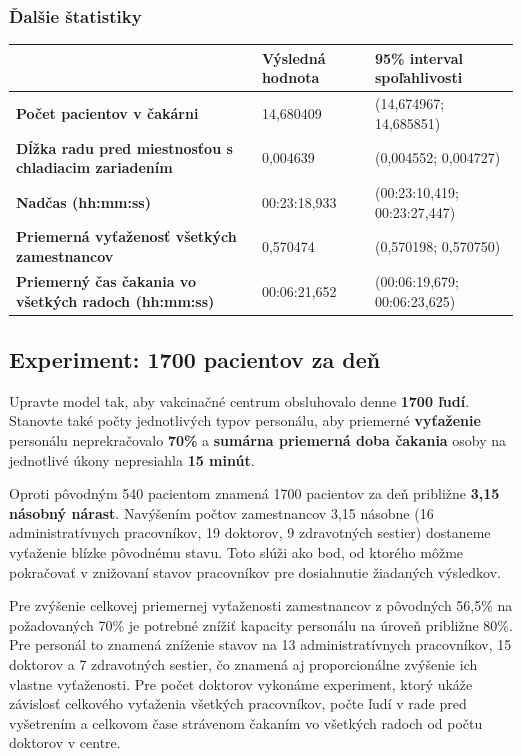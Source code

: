 \documentclass[letterpaper]{article}
\begin{document}
	\subsubsection*{Ďalšie štatistiky}
	
	\begin{table}[hbt!]
		\begin{tabular}{p{6cm}|p{4.5cm}p{4.5cm}}
			& \textbf{Výsledná hodnota} & \textbf{95\% interval spoľahlivosti} \\
			\hline\hline
			\textbf{Počet pacientov v čakárni} 								& 14,680409           & (14,674967; 14,685851)			
			\\\hline
			\textbf{Dĺžka radu pred miestnosťou s chladiacim zariadením}	& 0,004639            & (0,004552; 0,004727)	
			\\\hline
			\textbf{Nadčas (hh:mm:ss)}										& 00:23:18,933        & (00:23:10,419; 00:23:27,447)
			\\\hline
			\textbf{Priemerná vyťaženosť všetkých zamestnancov}  			& 0,570474            & (0,570198; 0,570750)
			\\\hline
			\textbf{Priemerný čas čakania vo všetkých radoch (hh:mm:ss)}	& 00:06:21,652        & (00:06:19,679; 00:06:23,625)
		\end{tabular}
	\end{table}

	\subsection{Experiment: 1700 pacientov za deň}
	
	Upravte model tak, aby vakcinačné centrum obsluhovalo denne \textbf{1700 ľudí}. Stanovte také počty jednotlivých typov personálu, aby priemerné \textbf{vyťaženie} personálu neprekračovalo \textbf{70\%} a \textbf{sumárna priemerná doba čakania} osoby na jednotlivé úkony nepresiahla \textbf{15 minút}.
	
	Oproti pôvodným 540 pacientom znamená 1700 pacientov za deň približne \textbf{3,15 násobný nárast}. Navýšením počtov zamestnancov 3,15 násobne (16 administratívnych pracovníkov, 19 doktorov, 9 zdravotných sestier) dostaneme vyťaženie blízke pôvodnému stavu. Toto slúži ako bod, od ktorého môžme pokračovať v znižovaní stavov pracovníkov pre dosiahnutie žiadaných výsledkov.
	
	Pre zvýšenie celkovej priemernej vyťaženosti zamestnancov z pôvodných 56,5\% na požadovaných 70\% je potrebné znížiť kapacity personálu na úroveň približne 80\%. Pre personál to znamená zníženie stavov na 13 administratívnych pracovníkov, 15 doktorov a 7 zdravotných sestier, čo znamená aj proporcionálne zvýšenie ich vlastne vyťaženosti. Pre počet doktorov vykonáme experiment, ktorý ukáže závislosť celkového vyťaženia všetkých pracovníkov, počte ľudí v rade pred vyšetrením a celkovom čase strávenom čakaním vo všetkých radoch od počtu doktorov v centre.
	
\end{document}
